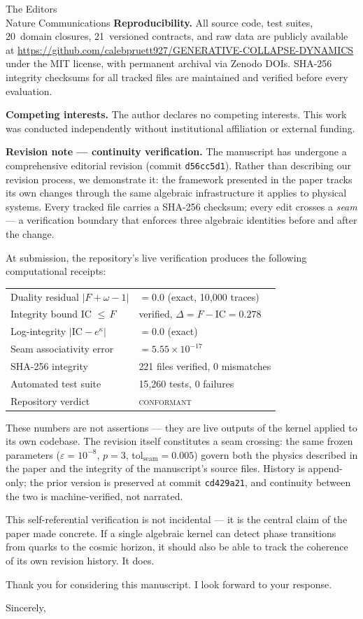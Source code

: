 \documentclass[11pt]{letter}
\begin{document}
\begin{letter}{The Editors\\Nature Communications}
\textbf{Reproducibility.} All source code, test suites,
20~domain closures, 21~versioned contracts, and raw data are
publicly available at
\url{https://github.com/calebpruett927/GENERATIVE-COLLAPSE-DYNAMICS}
under the MIT license, with permanent archival via Zenodo DOIs.
SHA-256 integrity checksums for all tracked files are maintained
and verified before every evaluation.

\textbf{Competing interests.} The author declares no competing
interests. This work was conducted independently without
institutional affiliation or external funding.

\textbf{Revision note --- continuity verification.}
The manuscript has undergone a comprehensive editorial revision
(commit \texttt{d56cc5d1}).
Rather than describing our revision process, we demonstrate it:
the framework presented in the paper tracks its own changes
through the same algebraic infrastructure it applies to physical
systems. Every tracked file carries a SHA-256 checksum; every
edit crosses a \emph{seam} --- a verification boundary that
enforces three algebraic identities before and after the change.

At submission, the repository's live verification produces the
following computational receipts:

\smallskip
\begin{tabular}{@{}ll@{}}
  Duality residual $|F + \omega - 1|$ & $= 0.0$ (exact, 10{,}000 traces) \\
  Integrity bound IC $\leq\,F$        & verified, $\Delta = F - \text{IC} = 0.278$ \\
  Log-integrity $|\text{IC} - e^{\kappa}|$ & $= 0.0$ (exact) \\
  Seam associativity error             & $= 5.55 \times 10^{-17}$ \\
  SHA-256 integrity                    & 221 files verified, 0 mismatches \\
  Automated test suite                 & 15{,}260 tests, 0 failures \\
  Repository verdict                   & \textsc{conformant}
\end{tabular}
\smallskip

These numbers are not assertions --- they are live outputs of the
kernel applied to its own codebase. The revision itself constitutes
a seam crossing: the same frozen parameters ($\varepsilon = 10^{-8}$,
$p = 3$, tol$_{\mathrm{seam}} = 0.005$) govern both the physics
described in the paper and the integrity of the manuscript's source
files. History is append-only; the prior version is preserved at
commit \texttt{cd429a21}, and continuity between the two is
machine-verified, not narrated.

This self-referential verification is not incidental --- it is the
central claim of the paper made concrete. If a single algebraic
kernel can detect phase transitions from quarks to the cosmic
horizon, it should also be able to track the coherence of its own
revision history. It does.

Thank you for considering this manuscript. I look forward to your
response.

\closing{Sincerely,}

\end{letter}
\end{document}

